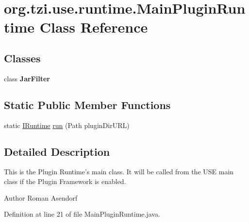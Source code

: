 \hypertarget{classorg_1_1tzi_1_1use_1_1runtime_1_1_main_plugin_runtime}{\section{org.\-tzi.\-use.\-runtime.\-Main\-Plugin\-Runtime Class Reference}
\label{classorg_1_1tzi_1_1use_1_1runtime_1_1_main_plugin_runtime}
}
\subsection*{Classes}
\begin{DoxyCompactItemize}
\item 
class {\bfseries Jar\-Filter}
\end{DoxyCompactItemize}
\subsection*{Static Public Member Functions}
\begin{DoxyCompactItemize}
\item 
static \hyperlink{interfaceorg_1_1tzi_1_1use_1_1main_1_1runtime_1_1_i_runtime}{I\-Runtime} \hyperlink{classorg_1_1tzi_1_1use_1_1runtime_1_1_main_plugin_runtime_ab06cd0176e8453ff3ffbf57ef7c9368b}{run} (Path plugin\-Dir\-U\-R\-L)
\end{DoxyCompactItemize}


\subsection{Detailed Description}
This is the Plugin Runtime's main class. It will be called from the U\-S\-E main class if the Plugin Framework is enabled.

\begin{DoxyAuthor}{Author}
Roman Asendorf 
\end{DoxyAuthor}


Definition at line 21 of file Main\-Plugin\-Runtime.\-java.



